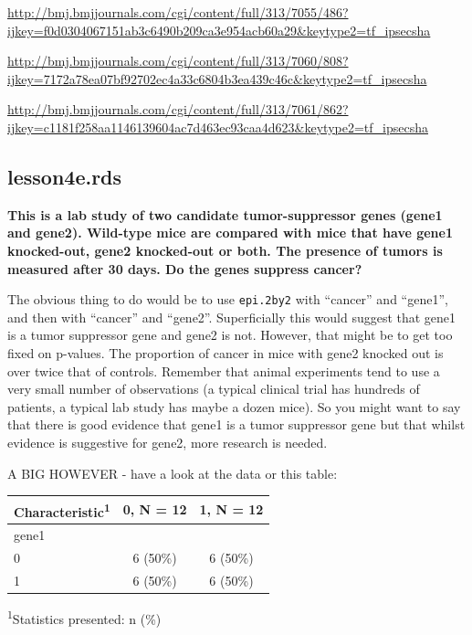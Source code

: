 \documentclass[]{book}
\newenvironment{Shaded}{\begin{snugshade}}{\end{snugshade}}
\newcommand{\DataTypeTok}[1]{\textcolor[rgb]{0.13,0.29,0.53}{#1}}
\newcommand{\KeywordTok}[1]{\textcolor[rgb]{0.13,0.29,0.53}{\textbf{#1}}}
\newcommand{\NormalTok}[1]{#1}
\newcommand{\OperatorTok}[1]{\textcolor[rgb]{0.81,0.36,0.00}{\textbf{#1}}}
\newcommand{\StringTok}[1]{\textcolor[rgb]{0.31,0.60,0.02}{#1}}
\begin{document}
\url{http://bmj.bmjjournals.com/cgi/content/full/313/7055/486?ijkey=f0d0304067151ab3c6490b209ca3e954acb60a29\&keytype2=tf_ipsecsha}

\url{http://bmj.bmjjournals.com/cgi/content/full/313/7060/808?ijkey=7172a78ea07bf92702ec4a33c6804b3ea439c46c\&keytype2=tf_ipsecsha}

\url{http://bmj.bmjjournals.com/cgi/content/full/313/7061/862?ijkey=c1181f258aa1146139604ac7d463ec93caa4d623\&keytype2=tf_ipsecsha}

\hypertarget{lesson4e.rds}{%
\subsection{lesson4e.rds}\label{lesson4e.rds}}

\textbf{This is a lab study of two candidate tumor-suppressor genes (gene1 and gene2). Wild-type mice are compared with mice that have gene1 knocked-out, gene2 knocked-out or both. The presence of tumors is measured after 30 days. Do the genes suppress cancer?}

The obvious thing to do would be to use \texttt{epi.2by2} with ``cancer'' and ``gene1'', and then with ``cancer'' and ``gene2''. Superficially this would suggest that gene1 is a tumor suppressor gene and gene2 is not. However, that might be to get too fixed on p-values. The proportion of cancer in mice with gene2 knocked out is over twice that of controls. Remember that animal experiments tend to use a very small number of observations (a typical clinical trial has hundreds of patients, a typical lab study has maybe a dozen mice). So you might want to say that there is good evidence that gene1 is a tumor suppressor gene but that whilst evidence is suggestive for gene2, more research is needed.

A BIG HOWEVER - have a look at the data or this table:

\begin{Shaded}
\end{Shaded}

\captionsetup[table]{labelformat=empty,skip=1pt}
\begin{longtable}{lcc}
\toprule
\textbf{Characteristic}\textsuperscript{1} & \textbf{0}, N = 12 & \textbf{1}, N = 12 \\ 
\midrule
gene1 &  &  \\ 
0 & 6 (50\%) & 6 (50\%) \\ 
1 & 6 (50\%) & 6 (50\%) \\ 
\bottomrule
\end{longtable}
\vspace{-5mm}
\begin{minipage}{\linewidth}
\textsuperscript{1}Statistics presented: n (\%) \\ 
\end{minipage}
\end{document}
